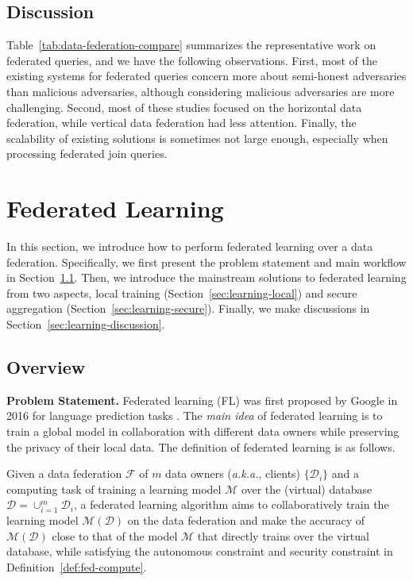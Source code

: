 \documentclass[11pt]{article}
\newcommand{\aka}{\textit{a.k.a.},\xspace}
\newcommand\tabref[1]{Table~\ref{#1}}
\newcommand\secref[1]{Section~\ref{#1}}
\newcommand\defref[1]{Definition~\ref{#1}}
\newcommand{\fakeparagraph}[1]{\vspace{1mm}\noindent\textbf{#1.}}
\newcommand{\F}{\mathcal{F}}
\newcommand{\D}{\mathcal{D}}
\newcommand{\M}{\mathcal{M}}
\begin{document}
\subsection{Discussion}\label{sec:data-summary}

\tabref{tab:data-federation-compare} summarizes the representative work on federated queries, and we have the following observations. First, most of the existing systems for federated queries concern more about semi-honest adversaries than malicious adversaries, although considering malicious adversaries are more challenging. Second, most of these studies focused on the horizontal data federation, while vertical data federation had less attention. Finally, the scalability of existing solutions is sometimes not large enough, especially when processing federated join queries.

\section{Federated Learning}\label{sec:learning}

In this section, we introduce how to perform federated learning over a data federation.
Specifically, we first present the problem statement and main workflow in \secref{sec:learning-overview}.
Then, we introduce the mainstream solutions to federated learning from two aspects,
local training (\secref{sec:learning-local}) and secure aggregation (\secref{sec:learning-secure}).
Finally, we make discussions in \secref{sec:learning-discussion}.

\subsection{Overview}\label{sec:learning-overview}

\fakeparagraph{Problem Statement} Federated learning (FL) was first proposed by Google in 2016 for language prediction tasks \cite{DBLP:conf/aistats/McMahanMRHA17}. The \textit{main idea} of federated learning is to train a global model in collaboration with different data owners while preserving the privacy of their local data. The definition of federated learning is as follows.

\begin{definition}\label{def:fed-learning}
Given a data federation $\F$ of $m$ data owners (\aka clients) $\{\D_i\}$ and a computing task of training a learning model $\M$ over the (virtual) database $\D=\cup_{i=1}^{m}{\D_i}$, a federated learning algorithm aims to collaboratively train the learning model $\M(\D)$ on the data federation and make the accuracy of $\M(\D)$ close to that of the model $\M$ that directly trains over the virtual database, while satisfying the autonomous constraint and security constraint in \defref{def:fed-compute}.
\end{definition}
\end{document}
